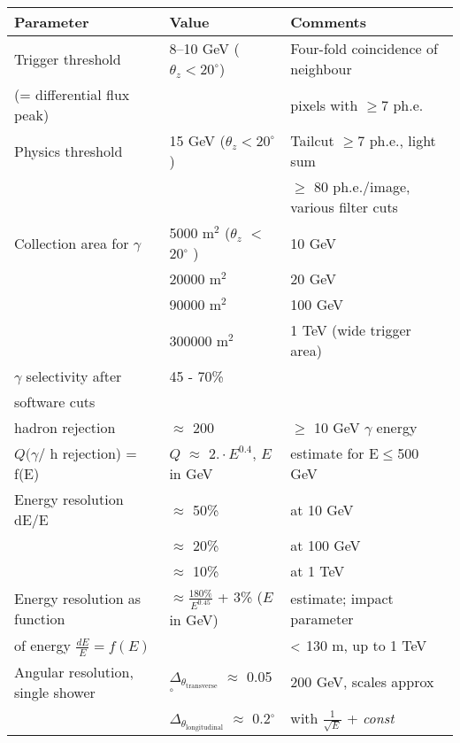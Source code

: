 \begin{table}
{\footnotesize
\begin{tabular}{|l|l|l|}
\hline
Parameter & Value & Comments \\ \hline\hline
Trigger threshold & 8--10 GeV ($\theta _{z}<20^{\circ }$) & Four-fold
coincidence of neighbour \\ 
(= differential flux peak) &  & pixels with $\geq 7$ ph.e. \\ \hline
Physics threshold & 15 GeV ($\theta _{z}<20^{\circ }$) & Tailcut $\geq 7$
ph.e., light sum \\ 
&  & $\geq $ 80 ph.e./image, various filter cuts \\ \hline
Collection area for $\gamma $ & 5000 m$^{2}$ ($\theta _{z}$ $<$ 20$^{\circ }$%
) & 10 GeV \\ 
& 20000 m$^{2}$ & 20 GeV \\ 
& 90000 m$^{2}$ & 100 GeV \\ 
& 300000 m$^{2}$ & 1 TeV (wide trigger area) \\ \hline
$\gamma $ selectivity after & 45 - 70\% &  \\ 
software cuts &  &  \\ \hline
hadron rejection & $\approx $ 200 & $\geq$ 10 GeV $\gamma$ energy \\ 
$Q(\gamma $/ h rejection) = f(E) & $Q$ $\approx $ $2. \cdot E^{0.4}$, $E$ in GeV
& estimate for E$\leq$500 GeV\\ \hline
Energy resolution dE/E & $\approx $ 50\% & at 10 GeV \\ 
& $\approx $ 20\% & at 100 GeV \\ \hline
& $\approx $ 10\% & at 1 TeV \\ \hline
Energy resolution as function & $\approx \frac{180\%}{E^{0.45}}$ + 3\% ($E$ in GeV) & 
estimate; impact parameter \\ 
of energy $\frac{dE}{E}=f(E)$ &  & $\rm{<}$ 130 m, up to 1 TeV \\ 
\hline
Angular resolution, single shower & $\Delta _{\theta _\mathrm{transverse}}$ $ \approx $ 0.05$^{\circ }$ & 200 GeV, scales approx \\ 
                        & $\Delta _{\theta
                        _\mathrm{longitudinal}}$ $\approx $
                        0.2$^{\circ }$ & with
                        $\frac{1}{\sqrt{E}}$ + {\it const}

\end{tabular}}
\end{table}
